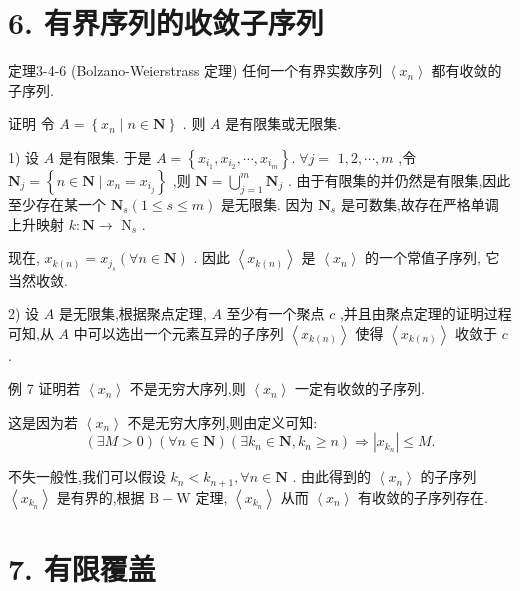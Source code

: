 \section*{6. 有界序列的收敛子序列}

定理3-4-6 (Bolzano-Weierstrass 定理) 任何一个有界实数序列 $\left\langle  {x}_{n}\right\rangle$ 都有收敛的子序列.

证明 令 $A = \left\{  {{x}_{n} \mid  n \in  \mathbf{N}}\right\}$ . 则 $A$ 是有限集或无限集.

1) 设 $A$ 是有限集. 于是 $A = \left\{  {{x}_{{i}_{1}},{x}_{{i}_{2}},\cdots ,{x}_{{i}_{m}}}\right\}  .\;\forall j =$  $1,2,\cdots ,m$ ,令 ${\mathbf{N}}_{j} = \left\{  {n \in  \mathbf{N} \mid  {x}_{n} = {x}_{{i}_{j}}}\right\}$ ,则 $\mathbf{N} = \mathop{\bigcup }\limits_{{j = 1}}^{m}{\mathbf{N}}_{j}$ . 由于有限集的并仍然是有限集,因此至少存在某一个 ${\mathbf{N}}_{s}\left( {1 \leq  s \leq  m}\right)$ 是无限集. 因为 ${\mathbf{N}}_{s}$ 是可数集,故存在严格单调上升映射 $k : \mathbf{N} \rightarrow$  ${\mathrm{N}}_{s}$ .

现在, ${x}_{k\left( n\right) } = {x}_{{j}_{s}}\left( {\forall n \in  \mathbf{N}}\right)$ . 因此 $\left\langle  {x}_{k\left( n\right) }\right\rangle$ 是 $\left\langle  {x}_{n}\right\rangle$ 的一个常值子序列, 它当然收敛.

2) 设 $A$ 是无限集,根据聚点定理, $A$ 至少有一个聚点 $c$ ,并且由聚点定理的证明过程可知,从 $A$ 中可以选出一个元素互异的子序列 $\left\langle  {x}_{k\left( n\right) }\right\rangle$ 使得 $\left\langle  {x}_{k\left( n\right) }\right\rangle$ 收敛于 $c$ .

例 7 证明若 $\left\langle  {x}_{n}\right\rangle$ 不是无穷大序列,则 $\left\langle  {x}_{n}\right\rangle$ 一定有收敛的子序列.

这是因为若 $\left\langle  {x}_{n}\right\rangle$ 不是无穷大序列,则由定义可知:
$$\left( {\exists M > 0}\right) \left( {\forall n \in  \mathbf{N}}\right) \left( {\exists {k}_{n} \in  \mathbf{N},{k}_{n} \geq  n}\right)  \Rightarrow  \left| {x}_{{k}_{n}}\right|  \leq  M.$$

不失一般性,我们可以假设 ${k}_{n} < {k}_{n + 1},\forall n \in  \mathbf{N}$ . 由此得到的 $\left\langle  {x}_{n}\right\rangle$ 的子序列 $\left\langle  {x}_{{k}_{n}}\right\rangle$ 是有界的,根据 $\mathrm{B} - \mathrm{W}$ 定理, $\left\langle  {x}_{{k}_{n}}\right\rangle$ 从而 $\left\langle  {x}_{n}\right\rangle$ 有收敛的子序列存在.

\section*{7. 有限覆盖}

